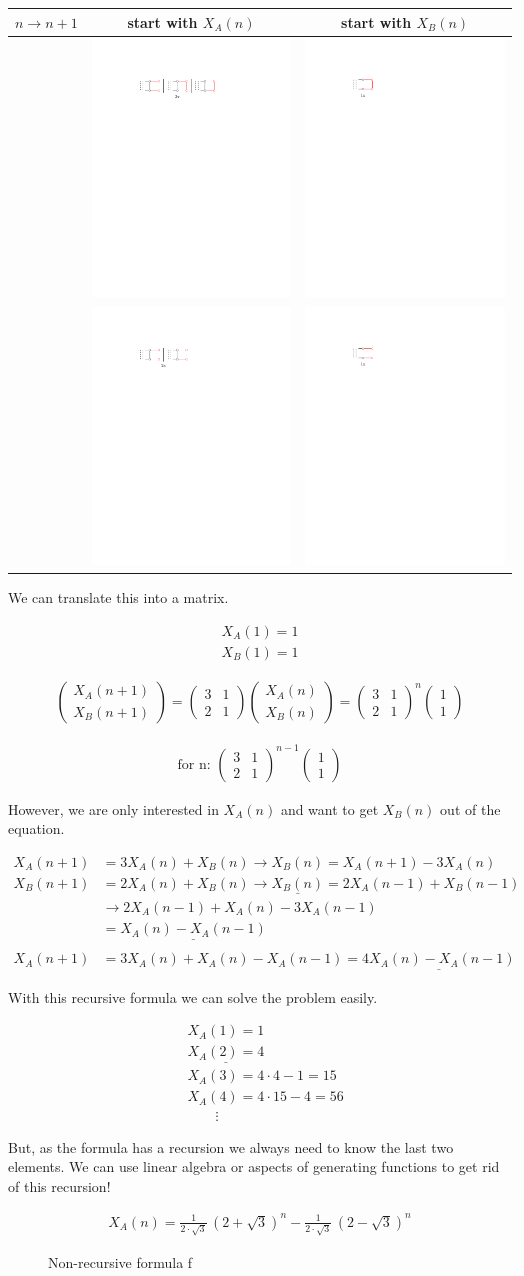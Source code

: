 \documentclass[12pt,onecolumn%
]{scrartcl}
\newcommand{\fig}[2]{
\begin{figure}[H]
	\centering
	#1
	\captionsetup{width=0.8\textwidth, justification=centering}
	\caption{#2}
\end{figure}
}
\newcommand{\eq}[1]{
\begin{equation*}
\begin{aligned}
#1
\end{aligned}
\end{equation*}
}
\newcommand{\mat}[1]{
\begin{pmatrix}
#1
\end{pmatrix}
}
\begin{document}
\begin{center}
\begin{tabular}{c | c | c}
  $n \rightarrow n+1$ & start with $X_A (n)$ & start with $X_B (n)$ \\
  \hline
  \raisebox{3.7\height}{$X_A (n+1)$} &  \includegraphics[trim=130 600 220 110,clip]{img/ladder_table_cell1} & \includegraphics[trim=130 600 380 110,clip]{img/ladder_table_cell2} \\
  \hline
  \raisebox{3.7\height}{$X_B (n+1)$} & \includegraphics[trim=130 600 300 110,clip]{img/ladder_table_cell3} & \includegraphics[trim=130 600 380 110,clip]{img/ladder_table_cell4}
\end{tabular}
\end{center}

We can translate this into a matrix.

\eq{
	X_A (1) = 1 \\
	X_B (1) = 1
}

\eq{
	\mat{X_A (n+1) \\ X_B (n+1)} = \mat{3&1 \\ 2&1} \mat{X_A (n) \\ X_B (n)} = \mat{3&1 \\ 2&1}^n \mat{1 \\ 1}
}

\eq{\text{for n: } \mat{3&1 \\ 2&1}^{n-1} \mat{1 \\ 1}}

However, we are only interested in $X_A(n)$ and want to get $X_B(n)$ out of the equation.

\eq{
	X_A(n+1) &= 3X_A(n) + X_B(n) \rightarrow X_B(n) = X_A(n+1) - 3X_A(n) \\
	X_B(n+1) &= 2X_A(n) + X_B(n) \rightarrow \underline{X_B(n)} = 2X_A(n-1) + X_B(n-1) \\
	&\rightarrow 2X_A(n-1) + X_A(n) - 3X_A(n-1) \\
	&= \underline{X_A(n) - X_A(n-1)} \\
	\\
	X_A(n+1) &= 3X_A(n) + X_A(n) - X_A(n-1) = \underline{4X_A(n) - X_A(n-1)}
}

With this recursive formula we can solve the problem easily.

\eq{
	&X_A(1) = 1 \\
	&\underline{X_A(2) = 4} \\
	&X_A(3) = 4 \cdot 4 -1 = 15 \\
	&X_A(4) = 4 \cdot 15 - 4 = 56 \\
	&\qquad \vdots
}

But, as the formula has a recursion we always need to know the last two elements. We can use linear algebra or aspects of generating functions to get rid of this recursion!

\fig{
	\eq{
		X_A(n) = \frac{1}{2 \cdot \sqrt{3}} \, (2+\sqrt{3})^n - \frac{1}{2 \cdot \sqrt{3}} \, (2-\sqrt{3})^n
	}
}{Non-recursive formula f}
\end{document}
